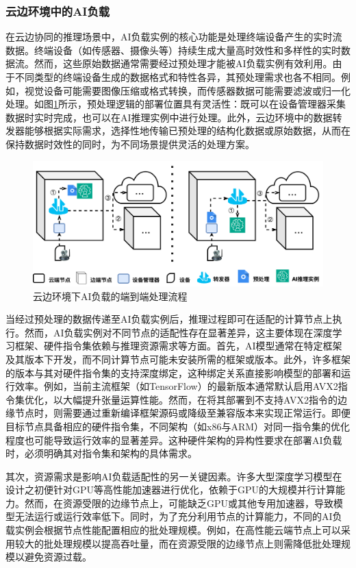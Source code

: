 \subsubsection{云边环境中的AI负载}

在云边协同的推理场景中，AI负载实例的核心功能是处理终端设备产生的实时流数据。终端设备（如传感器、摄像头等）持续生成大量高时效性和多样性的实时数据流。然而，这些原始数据通常需要经过预处理才能被AI负载实例有效利用。由于不同类型的终端设备生成的数据格式和特性各异，其预处理需求也各不相同。例如，视觉设备可能需要图像压缩或格式转换，而传感器数据可能需要滤波或归一化处理。如图\ref{fig:3-4aiload}所示，预处理逻辑的部署位置具有灵活性：既可以在设备管理器采集数据时实时完成，也可以在AI推理实例中进行处理。此外，云边环境中的数据转发器能够根据实际需求，选择性地传输已预处理的结构化数据或原始数据，从而在保持数据时效性的同时，为不同场景提供灵活的处理方案。

\begin{figure}[h]
  \centering
  \includegraphics[width=0.9\linewidth]{pics/3-4AI负载.png}
  \caption{云边环境下AI负载的端到端处理流程}
  \label{fig:3-4aiload}
\end{figure}

当经过预处理的数据传递至AI负载实例后，推理过程即可在适配的计算节点上执行。然而，AI负载实例对不同节点的适配性存在显著差异，这主要体现在深度学习框架、硬件指令集依赖与推理资源需求等方面。首先，AI模型通常在特定框架及其版本下开发，而不同计算节点可能未安装所需的框架或版本。此外，许多框架的版本与其对硬件指令集的支持深度绑定，这种绑定关系直接影响模型的部署和运行效率。例如，当前主流框架（如TensorFlow）的最新版本通常默认启用AVX2指令集优化，以大幅提升张量运算性能。然而，在将其部署到不支持AVX2指令的边缘节点时，则需要通过重新编译框架源码或降级至兼容版本来实现正常运行。即便目标节点具备相应的硬件指令集，不同架构（如x86与ARM）对同一指令集的优化程度也可能导致运行效率的显著差异\cite{ren2019performance}。这种硬件架构的异构性要求在部署AI负载时，必须明确其对指令集和架构的具体需求。

其次，资源需求是影响AI负载适配性的另一关键因素。许多大型深度学习模型在设计之初便针对GPU等高性能加速器进行优化，依赖于GPU的大规模并行计算能力。然而，在资源受限的边缘节点上，可能缺乏GPU或其他专用加速器，导致模型无法运行或运行效率低下。同时，为了充分利用节点的计算能力，不同的AI负载实例会根据节点性能配置相应的批处理规模。例如，在高性能云端节点上可以采用较大的批处理规模以提高吞吐量，而在资源受限的边缘节点上则需降低批处理规模以避免资源过载。

